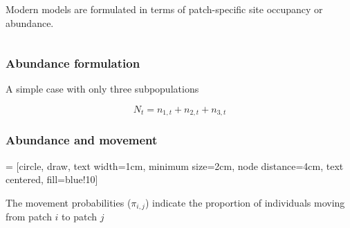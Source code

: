\documentclass[color=usenames,dvipsnames]{beamer}\usepackage[]{graphicx}\usepackage[]{xcolor}
\begin{document}
\begin{frame}
\begin{columns}
\begin{column}{0.7\textwidth}
      \pause
      \vspace{1cm}
      {Modern models are formulated in terms of patch-specific
        \alert{site occupancy} or \alert{abundance}. \par}
    \end{column}
  \end{columns}
\end{frame}







\begin{frame}
  \frametitle{Abundance formulation}
  \Large
  {\centering A simple case with only three subpopulations \par}
  \[
    N_t = n_{1,t} + n_{2,t} + n_{3,t}
  \]
\end{frame}





\begin{frame}
  \frametitle{Abundance and movement}
   = [circle, draw, text width=1cm, minimum size=2cm,
    node distance=4cm, text centered, fill=blue!10]
    \begin{center}
    \end{center}
    The movement probabilities ($\pi_{i,j}$) indicate the proportion of
    individuals moving from patch $i$ to patch $j$
\end{frame}
\end{document}
